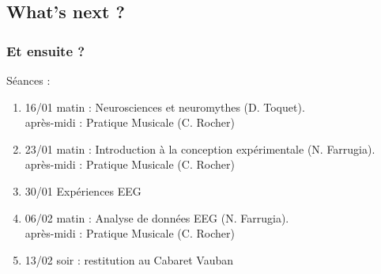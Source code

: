 \documentclass[xcolor=dvipsnames,english]{beamer}
\begin{document}
\subsection{What's next ?}



\begin{frame}
  \frametitle{Et ensuite ?}
  Séances : 
  \begin{enumerate}
  \item 16/01 matin : Neurosciences et neuromythes (D. Toquet).\\ après-midi : Pratique Musicale (C. Rocher)
  \item 23/01 matin : Introduction à la conception expérimentale (N. Farrugia). \\ après-midi : Pratique Musicale (C. Rocher)
  \item 30/01 Expériences EEG
  \item 06/02 matin : Analyse de données EEG (N. Farrugia). \\après-midi : Pratique Musicale (C. Rocher)
  \item 13/02 soir : restitution au Cabaret Vauban 
  \end{enumerate}
  \end{frame}
\end{document}
